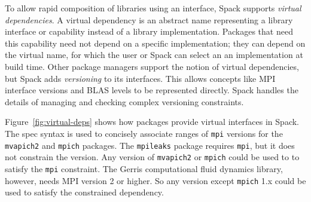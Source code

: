 To allow rapid composition of libraries using an interface, Spack supports
{\it virtual dependencies}.  A virtual dependency is an abstract name
representing a library interface or capability instead of a library
implementation.  Packages that need this capability need not depend on
a specific implementation; they can depend on the virtual name, for which
the user or Spack can select an an implementation at build time.
Other package managers support the notion of virtual dependencies, but Spack
adds {\it versioning} to its interfaces.  This allows concepts like MPI
interface versions and BLAS levels to be represented directly.  Spack
handles the details of managing and checking complex versioning constraints.

Figure~\ref{fig:virtual-deps} shows how packages provide
virtual interfaces in Spack.  The spec syntax is used to concisely
associate ranges of {\tt mpi} versions for the {\tt mvapich2} and {\tt mpich} packages.
The {\tt mpileaks} package requires {\tt mpi}, but it does not constrain the version.
Any version of {\tt mvapich2} or {\tt mpich} could be used to to satisfy the {\tt mpi}
constraint. The Gerris computational fluid dynamics library, however, needs MPI version 2 or higher.  So any
version except {\tt mpich} 1.x could be used to satisfy the constrained dependency.


